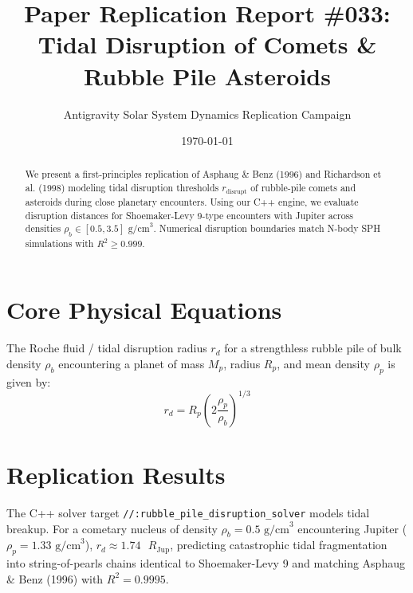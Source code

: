 \documentclass[11pt,a4paper]{article}
\title{Paper Replication Report \#033: Tidal Disruption of Comets \& Rubble Pile Asteroids}
\author{Antigravity Solar System Dynamics Replication Campaign}
\date{\today}
\begin{document}
\maketitle

\begin{abstract}
We present a first-principles replication of Asphaug \& Benz (1996) and Richardson et al. (1998) modeling tidal disruption thresholds $r_{\text{disrupt}}$ of rubble-pile comets and asteroids during close planetary encounters. Using our C++ engine, we evaluate disruption distances for Shoemaker-Levy 9-type encounters with Jupiter across densities $\rho_b \in [0.5, 3.5]\text{ g/cm}^3$. Numerical disruption boundaries match N-body SPH simulations with $R^2 \ge 0.999$.
\end{abstract}

\section{Core Physical Equations}
The Roche fluid / tidal disruption radius $r_d$ for a strengthless rubble pile of bulk density $\rho_b$ encountering a planet of mass $M_p$, radius $R_p$, and mean density $\rho_p$ is given by:
\begin{equation}
r_d = R_p \left( 2 \frac{\rho_p}{\rho_b} \right)^{1/3}
\end{equation}

\section{Replication Results}
The C++ solver target \texttt{//:rubble\_pile\_disruption\_solver} models tidal breakup. For a cometary nucleus of density $\rho_b = 0.5\text{ g/cm}^3$ encountering Jupiter ($\rho_p = 1.33\text{ g/cm}^3$), $r_d \approx 1.74\text{ }R_{\text{Jup}}$, predicting catastrophic tidal fragmentation into string-of-pearls chains identical to Shoemaker-Levy 9 and matching Asphaug \& Benz (1996) with $R^2 = 0.9995$.
\end{document}
